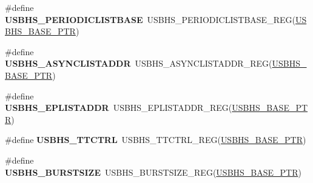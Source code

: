 \begin{DoxyCompactItemize}
\item 
\hypertarget{group___u_s_b_h_s___register___accessor___macros_ga7cd5265dcdd1cb4a42b543d107a5e106}{}\#define {\bfseries U\+S\+B\+H\+S\+\_\+\+P\+E\+R\+I\+O\+D\+I\+C\+L\+I\+S\+T\+B\+A\+S\+E}~U\+S\+B\+H\+S\+\_\+\+P\+E\+R\+I\+O\+D\+I\+C\+L\+I\+S\+T\+B\+A\+S\+E\+\_\+\+R\+E\+G(\hyperlink{group___u_s_b_h_s___peripheral_gaa2bc10b8cd66f96acd39e15b3a581306}{U\+S\+B\+H\+S\+\_\+\+B\+A\+S\+E\+\_\+\+P\+T\+R})\label{group___u_s_b_h_s___register___accessor___macros_ga7cd5265dcdd1cb4a42b543d107a5e106}

\item 
\hypertarget{group___u_s_b_h_s___register___accessor___macros_ga7dd22b11d8f55bc51cd3ea808725c4b2}{}\#define {\bfseries U\+S\+B\+H\+S\+\_\+\+A\+S\+Y\+N\+C\+L\+I\+S\+T\+A\+D\+D\+R}~U\+S\+B\+H\+S\+\_\+\+A\+S\+Y\+N\+C\+L\+I\+S\+T\+A\+D\+D\+R\+\_\+\+R\+E\+G(\hyperlink{group___u_s_b_h_s___peripheral_gaa2bc10b8cd66f96acd39e15b3a581306}{U\+S\+B\+H\+S\+\_\+\+B\+A\+S\+E\+\_\+\+P\+T\+R})\label{group___u_s_b_h_s___register___accessor___macros_ga7dd22b11d8f55bc51cd3ea808725c4b2}

\item 
\hypertarget{group___u_s_b_h_s___register___accessor___macros_ga1c63283f8b1ece4721d774bf57aedf7a}{}\#define {\bfseries U\+S\+B\+H\+S\+\_\+\+E\+P\+L\+I\+S\+T\+A\+D\+D\+R}~U\+S\+B\+H\+S\+\_\+\+E\+P\+L\+I\+S\+T\+A\+D\+D\+R\+\_\+\+R\+E\+G(\hyperlink{group___u_s_b_h_s___peripheral_gaa2bc10b8cd66f96acd39e15b3a581306}{U\+S\+B\+H\+S\+\_\+\+B\+A\+S\+E\+\_\+\+P\+T\+R})\label{group___u_s_b_h_s___register___accessor___macros_ga1c63283f8b1ece4721d774bf57aedf7a}

\item 
\hypertarget{group___u_s_b_h_s___register___accessor___macros_ga86c3fd944f9c62c191be1ffb67ba9f05}{}\#define {\bfseries U\+S\+B\+H\+S\+\_\+\+T\+T\+C\+T\+R\+L}~U\+S\+B\+H\+S\+\_\+\+T\+T\+C\+T\+R\+L\+\_\+\+R\+E\+G(\hyperlink{group___u_s_b_h_s___peripheral_gaa2bc10b8cd66f96acd39e15b3a581306}{U\+S\+B\+H\+S\+\_\+\+B\+A\+S\+E\+\_\+\+P\+T\+R})\label{group___u_s_b_h_s___register___accessor___macros_ga86c3fd944f9c62c191be1ffb67ba9f05}

\item 
\hypertarget{group___u_s_b_h_s___register___accessor___macros_gaa1adcc02f3edfac7d43a659877eaa1e0}{}\#define {\bfseries U\+S\+B\+H\+S\+\_\+\+B\+U\+R\+S\+T\+S\+I\+Z\+E}~U\+S\+B\+H\+S\+\_\+\+B\+U\+R\+S\+T\+S\+I\+Z\+E\+\_\+\+R\+E\+G(\hyperlink{group___u_s_b_h_s___peripheral_gaa2bc10b8cd66f96acd39e15b3a581306}{U\+S\+B\+H\+S\+\_\+\+B\+A\+S\+E\+\_\+\+P\+T\+R})\label{group___u_s_b_h_s___register___accessor___macros_gaa1adcc02f3edfac7d43a659877eaa1e0}


\end{DoxyCompactItemize}
